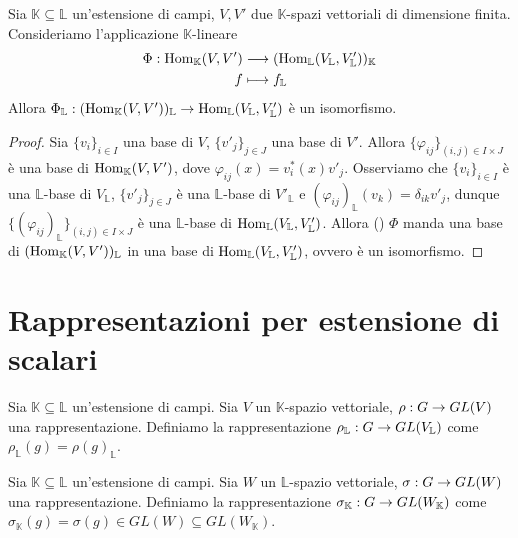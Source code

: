 \begin{proposition}
Sia $\mathbb{K}\subseteq\mathbb{L}$ un'estensione di campi, $V\comma V'$ due $\mathbb{K}$-spazi vettoriali di dimensione finita. Consideriamo l'applicazione $\mathbb{K}$-lineare
\begin{align*}
\Phi:\operatorname{Hom}_\mathbb{K}(V,V')&\longrightarrow(\operatorname{Hom}_\mathbb{L}(V_\mathbb{L},V'_\mathbb{L}))_\mathbb{K}\\
f&\longmapsto f_\mathbb{L}
\end{align*}
Allora $\Phi_\mathbb{L}:(\operatorname{Hom}_\mathbb{K}(V,V'))_\mathbb{L}\to\operatorname{Hom}_\mathbb{L}(V_\mathbb{L},V'_\mathbb{L})$ è un isomorfismo.
\end{proposition}
\begin{proof}
Sia $\{v_i\}_{i\in I}$ una base di $V$, $\{v'_j\}_{j\in J}$ una base di $V'$. Allora $\{\varphi_{ij}\}_{(i,j)\in I\times J}$ è una base di $\operatorname{Hom}_\mathbb{K}(V, V')$, dove $\varphi_{ij}(x)=v_i^*(x)v'_j$. Osserviamo che $\{v_i\}_{i\in I}$ è una $\mathbb{L}$-base di $V_\mathbb{L}$, $\{v'_j\}_{j\in J}$ è una $\mathbb{L}$-base di $V'_\mathbb{L}$ e $(\varphi_{ij})_\mathbb{L}(v_k)=\delta_{ik}v'_j$, dunque $\{(\varphi_{ij})_\mathbb{L}\}_{(i,j)\in I\times J}$ è una $\mathbb{L}$-base di $\operatorname{Hom}_\mathbb{L}(V_\mathbb{L},V'_\mathbb{L})$. Allora () $\Phi$ manda una base di $(\operatorname{Hom}_\mathbb{K}(V,V'))_\mathbb{L}$ in una base di $\operatorname{Hom}_\mathbb{L}(V_\mathbb{L},V'_\mathbb{L})$, ovvero è un isomorfismo.
\end{proof}


\section{Rappresentazioni per estensione di scalari}

\begin{definition}
Sia $\mathbb{K}\subseteq\mathbb{L}$ un'estensione di campi. Sia $V$ un $\mathbb{K}$-spazio vettoriale, $\rho:G\to GL(V)$ una rappresentazione. Definiamo la rappresentazione $\rho_\mathbb{L}:G\to GL(V_\mathbb{L})$ come $\rho_\mathbb{L}(g)=\rho(g)_\mathbb{L}$.
\end{definition}

\begin{definition}
Sia $\mathbb{K}\subseteq\mathbb{L}$ un'estensione di campi. Sia $W$ un $\mathbb{L}$-spazio vettoriale, $\sigma:G\to GL(W)$ una rappresentazione. Definiamo la rappresentazione $\sigma_\mathbb{K}:G\to GL(W_\mathbb{K})$ come $\sigma_\mathbb{K}(g)=\sigma(g)\in GL(W)\subseteq GL(W_\mathbb{K})$.
\end{definition}

